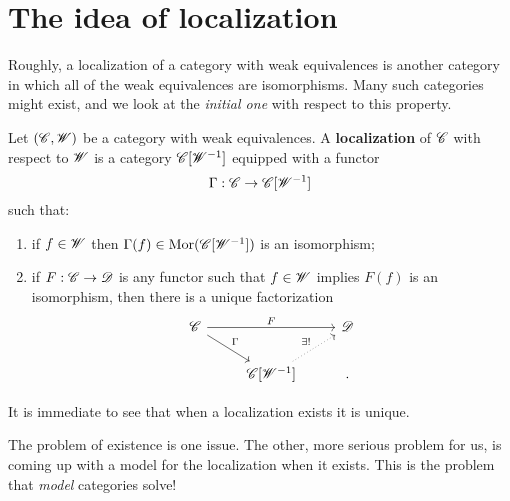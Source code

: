 \documentclass[11pt]{amsart}
\begin{document}
\section{The idea of localization}

Roughly, a localization of a category with weak equivalences is another category in which all of the weak equivalences are isomorphisms. 
Many such categories might exist, and we look at the {\em initial one} with respect to this property. 

\begin{dfn}
Let $(\mathscr C, \mathscr W)$ be a category with weak equivalences. 
A {\bf localization} of $\mathscr C$ with respect to $\mathscr W$ is a category $\mathscr C[\mathscr W^{-1}]$ equipped with a functor
\[
\Gamma : \mathscr C \to \mathscr C[\mathscr W^{-1}]
\]
such that:
\begin{enumerate}
\item if $f \in \mathscr W$ then $\Gamma(f) \in {\rm Mor}(\mathscr C[\mathscr W^{-1}])$ is an isomorphism;
\item if $F : \mathscr C \to \mathscr D$ is any functor such that $f \in \mathscr W$ implies $F(f)$ is an isomorphism, then there is a unique factorization 
\[
\begin{tikzcd}
\sC \ar[rr, "F"] \ar[dr, "\Gamma"] & & \sD \\
& \sC[\sW^{-1}] \ar[ur, dotted, "\exists !"] & .
\end{tikzcd}
\] 
\end{enumerate}
\end{dfn}
It is immediate to see that when a localization exists it is unique. 

The problem of existence is one issue. 
The other, more serious problem for us, is coming up with a model for the localization when it exists. 
This is the problem that {\em model} categories solve!


%
%
%
%
%
\end{document}

